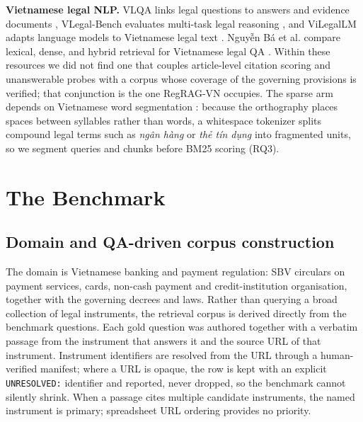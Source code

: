 \documentclass[conference,a4paper]{IEEEtran}
\begin{document}
\textbf{Vietnamese legal NLP.} VLQA links legal questions to answers and evidence documents \cite{nguyen2025vlqa}, VLegal-Bench evaluates multi-task legal reasoning \cite{dong2025vlegalbench}, and ViLegalLM adapts language models to Vietnamese legal text \cite{nguyen2026vilegallm}. Nguyễn Bá et al. compare lexical, dense, and hybrid retrieval for Vietnamese legal QA \cite{nguyen2024vnlegalir}. Within these resources we did not find one that couples article-level citation scoring and unanswerable probes with a corpus whose coverage of the governing provisions is verified; that conjunction is the one RegRAG-VN occupies. The sparse arm depends on Vietnamese word segmentation \cite{vu2018vncorenlp}: because the orthography places spaces between syllables rather than words, a whitespace tokenizer splits compound legal terms such as \emph{ngân hàng} or \emph{thẻ tín dụng} into fragmented units, so we segment queries and chunks before BM25 scoring (RQ3).

\section{The Benchmark}
\label{sec:benchmark}

\subsection{Domain and QA-driven corpus construction}
The domain is Vietnamese banking and payment regulation: SBV circulars on payment services, cards, non-cash payment and credit-institution organisation, together with the governing decrees and laws. Rather than querying a broad collection of legal instruments, the retrieval corpus is derived directly from the benchmark questions. Each gold question was authored together with a verbatim passage from the instrument that answers it and the source URL of that instrument. Instrument identifiers are resolved from the URL through a human-verified manifest; where a URL is opaque, the row is kept with an explicit \texttt{UNRESOLVED:} identifier and reported, never dropped, so the benchmark cannot silently shrink. When a passage cites multiple candidate instruments, the named instrument is primary; spreadsheet URL ordering provides no priority.
\end{document}
